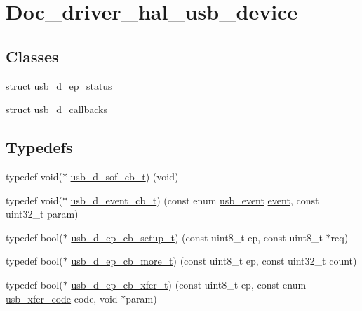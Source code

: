 \hypertarget{group__doc__driver__hal__usb__device}{}\section{Doc\+\_\+driver\+\_\+hal\+\_\+usb\+\_\+device}
\label{group__doc__driver__hal__usb__device}
\subsection*{Classes}
\begin{DoxyCompactItemize}
\item 
struct \hyperlink{structusb__d__ep__status}{usb\+\_\+d\+\_\+ep\+\_\+status}
\item 
struct \hyperlink{structusb__d__callbacks}{usb\+\_\+d\+\_\+callbacks}
\end{DoxyCompactItemize}
\subsection*{Typedefs}
\begin{DoxyCompactItemize}
\item 
typedef void($\ast$ \hyperlink{group__doc__driver__hal__usb__device_gaad808712d16d588e66167b3719c521ec}{usb\+\_\+d\+\_\+sof\+\_\+cb\+\_\+t}) (void)
\item 
typedef void($\ast$ \hyperlink{group__doc__driver__hal__usb__device_ga4bcb7ee43d9f4fe37c0e5ac05ed083d4}{usb\+\_\+d\+\_\+event\+\_\+cb\+\_\+t}) (const enum \hyperlink{hpl__usb_8h_ac59f9b94dab75e205ee8e980ee8efc94}{usb\+\_\+event} \hyperlink{structevent}{event}, const uint32\+\_\+t param)
\item 
typedef bool($\ast$ \hyperlink{group__doc__driver__hal__usb__device_ga9b29643c53a553c9b458a251bac3599a}{usb\+\_\+d\+\_\+ep\+\_\+cb\+\_\+setup\+\_\+t}) (const uint8\+\_\+t ep, const uint8\+\_\+t $\ast$req)
\item 
typedef bool($\ast$ \hyperlink{group__doc__driver__hal__usb__device_gacde84eacf3bd41ee46d38bbb8569021b}{usb\+\_\+d\+\_\+ep\+\_\+cb\+\_\+more\+\_\+t}) (const uint8\+\_\+t ep, const uint32\+\_\+t count)
\item 
typedef bool($\ast$ \hyperlink{group__doc__driver__hal__usb__device_gae62eea86879f5c1995f1ca99f095e7ab}{usb\+\_\+d\+\_\+ep\+\_\+cb\+\_\+xfer\+\_\+t}) (const uint8\+\_\+t ep, const enum \hyperlink{hpl__usb_8h_aade1cf1cf1633cd4c57b2b9d3b410c5e}{usb\+\_\+xfer\+\_\+code} code, void $\ast$param)
\end{DoxyCompactItemize}
